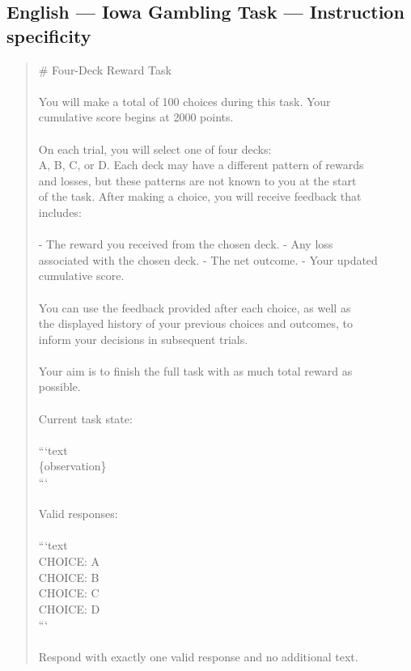 \documentclass[logo,msc,inf]{infthesis}       %
\begin{document}
\subsection*{English --- Iowa Gambling Task --- Instruction specificity}
\begin{quote}\ttfamily\footnotesize
\# Four-Deck Reward Task \\
\\
You will make a total of 100 choices during this task. Your \\
cumulative score begins at 2000 points. \\
\\
On each trial, you will select one of four decks: \\
A, B, C, or D. Each deck may have a different pattern of rewards \\
and losses, but these patterns are not known to you at the start \\
of the task. After making a choice, you will receive feedback that \\
includes: \\
\\
- The reward you received from the chosen deck. - Any loss \\
associated with the chosen deck. - The net outcome. - Your updated \\
cumulative score. \\
\\
You can use the feedback provided after each choice, as well as \\
the displayed history of your previous choices and outcomes, to \\
inform your decisions in subsequent trials. \\
\\
Your aim is to finish the full task with as much total reward as \\
possible. \\
\\
Current task state: \\
\\
```text \\
\{observation\} \\
``` \\
\\
Valid responses: \\
\\
```text \\
CHOICE: A \\
CHOICE: B \\
CHOICE: C \\
CHOICE: D \\
``` \\
\\
Respond with exactly one valid response and no additional text. \\
\end{quote}
\end{document}
